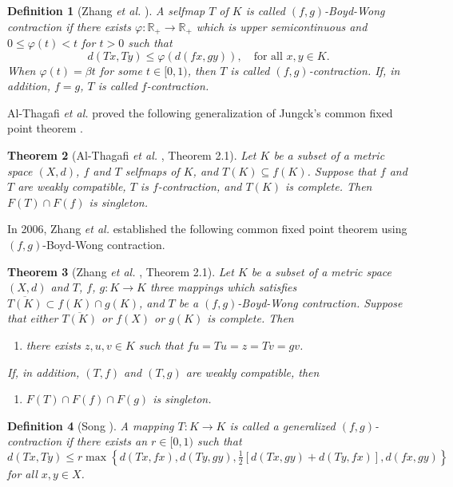 \documentclass[a4paper,12pt,oneside]{article}
\newtheorem{theorem}{Theorem}[section]
\newtheorem{definition}[theorem]{Definition}
\numberwithin{equation}{section}
\begin{document}
\begin{definition}[Zhang \emph{et al.} \cite{Zhang2008}]
A selfmap $T$ of $K$ is called $(f,g)$-\textit{Boyd-Wong contraction} if there exists $\varphi:\mathbb{R}_{+} \to \mathbb{R}_{+}$ which is upper semicontinuous and $0 \leq \varphi(t) < t$ for $t > 0$ such that
\begin{equation} \label{(2.2.1)}
d(Tx,Ty) \leq \varphi(d(fx,gy)), \quad \text{for all } x,y \in K.
\end{equation}
When $\varphi(t) = \beta t$ for some $t \in [0,1)$, then $T$ is called $(f,g)$-\textit{contraction}. If, in addition, $f = g$, $T$ is called $f$-\textit{contraction}.
\end{definition}

Al-Thagafi \emph{et al.} \cite{Al-Thagafi2006} proved the following generalization of Jungck's common fixed point theorem \cite{Jungck1986}.

\begin{theorem}[Al-Thagafi \emph{et al.} \cite{Al-Thagafi2006}, Theorem 2.1] \label{thrm 2.3}
Let $K$ be a subset of a metric space $(X,d)$, $f$ and $T$ selfmaps of $K$, and $T(K) \subseteq f(K)$. Suppose that $f$ and $T$ are weakly compatible, $T$ is $f$-contraction, and $T(K)$ is complete. Then $F(T) \cap F(f)$ is singleton.
\end{theorem}

In 2006, Zhang \emph{et al.} \cite{Zhang2008} established the following common fixed point theorem using $(f,g)$-Boyd-Wong contraction.

\begin{theorem}[Zhang \emph{et al.} \cite{Zhang2008}, Theorem 2.1] \label{thrm 2.4}
Let $K$ be a subset of a metric space $(X,d)$ and $T$, $f$, $g:K \to K$ three mappings which satisfies $\overline{T(K)} \subset f(K) \cap g(K)$, and $T$ be a $(f,g)$-Boyd-Wong contraction. Suppose that either $\overline{T(K)}$ or $f(X)$ or $g(K)$ is complete. Then
\begin{enumerate}
    \item[(i)] there exists $z,u,v \in K$ such that $fu = Tu = z = Tv = gv$.
\end{enumerate}
If, in addition, $(T,f)$ and $(T,g)$ are weakly compatible, then
\begin{enumerate}
    \item[(ii)] $F(T) \cap F(f) \cap F(g)$ is singleton.
\end{enumerate}
\end{theorem}
\begin{definition}[Song \cite{Song2007}]
A mapping $T:K \to K$ is called a \textit{generalized $(f,g)$-contraction} if there exists an $r \in [0,1)$ such that
\begin{equation} \label{(2.5.1)}
d(Tx,Ty) \leq r \max\left\{d(Tx,fx), d(Ty,gy), \tfrac{1}{2}[d(Tx,gy) + d(Ty,fx)], d(fx,gy)\right\}
\end{equation}
for all $x,y \in X$.
\end{definition}
\end{document}
